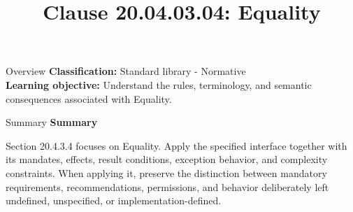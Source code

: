 \documentclass[10pt,letterpaper]{article}
\title{Clause 20.04.03.04: Equality}
\author{}
\date{}
\begin{document}
\maketitle
\begin{CornellOverviewBox}{Overview}
\textbf{Classification:} Standard library - Normative\\[2pt]
\textbf{Learning objective:} Understand the rules, terminology, and semantic consequences associated with Equality.
\end{CornellOverviewBox}\begin{CornellSummaryBox}{Summary}
{\sffamily\bfseries\color{Accent} Summary}\par\vspace{3pt}Section 20.4.3.4 focuses on Equality. Apply the specified interface together with its mandates, effects, result conditions, exception behavior, and complexity constraints. When applying it, preserve the distinction between mandatory requirements, recommendations, permissions, and behavior deliberately left undefined, unspecified, or implementation-defined.
\end{CornellSummaryBox}
\end{document}
